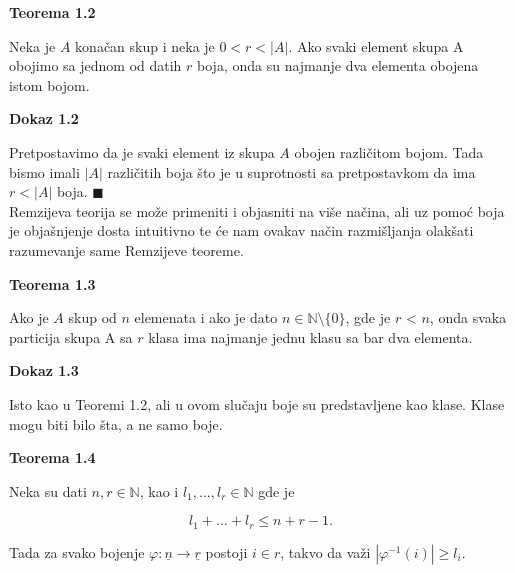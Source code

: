 \documentclass[12pt,a4paper]{article}
\begin{document}
	\vspace{0.5em}
	{\noindent\fontsize{12pt}{12pt}\textbf{Teorema 1.2}}
	\vspace{0.5em}

	\noindent Neka je $A$ konačan skup i neka je $0 < r < |A|$.
	Ako svaki element skupa A obojimo sa jednom od datih $r$ boja, onda su najmanje dva
	elementa obojena istom bojom.
	\vspace{1.5em}

	{\noindent\fontsize{12pt}{12pt}\textbf{Dokaz 1.2}}
	\vspace{0.5em}	

	\noindent Pretpostavimo da je svaki element iz skupa $A$ obojen različitom bojom. Tada bismo
	imali $|A|$ različitih boja što je u suprotnosti sa pretpostavkom da ima $r < |A|$ boja. $\blacksquare$\\

	\noindent Remzijeva teorija se može primeniti i objasniti na više načina, ali uz pomoć boja 
	je objašnjenje dosta intuitivno te će nam ovakav način razmišljanja olakšati razumevanje same Remzijeve teoreme.

	\vspace{0.5em}
	{\noindent\fontsize{12pt}{12pt}\textbf{Teorema 1.3}}
	\vspace{0.5em}

	\noindent Ako je $A$ skup od $n$ elemenata i ako je dato $n \in \mathbb{N}\setminus \lbrace 0 \rbrace$, gde je $r$ < $n$, onda svaka particija
	skupa A sa $r$ klasa ima najmanje jednu klasu sa bar dva elementa.
	\vspace{1.5em}

	{\noindent\fontsize{12pt}{12pt}\textbf{Dokaz 1.3}}
	\vspace{0.5em}

	\noindent Isto kao u Teoremi 1.2, ali u ovom slučaju boje su predstavljene kao klase.
	Klase mogu biti bilo šta, a ne samo boje.

	\vspace{0.5em}
	{\noindent\fontsize{12pt}{12pt}\textbf{Teorema 1.4}}
	\vspace{0.5em}

	\noindent Neka su dati $n, r \in \mathbb{N}$, kao i $l_{1},...,l_{r} \in \mathbb{N}$ gde je
	
	\[l_{1}+\dots+l_{r} \leq n+r-1.\]

	\noindent Tada za svako bojenje $\varphi:\underline{n} \rightarrow \underline{r}$ postoji $i \in r$, takvo da važi $|\varphi^{-1}(i)| \geq l_{i}.$
	\vspace{1.5em}
\end{document}
